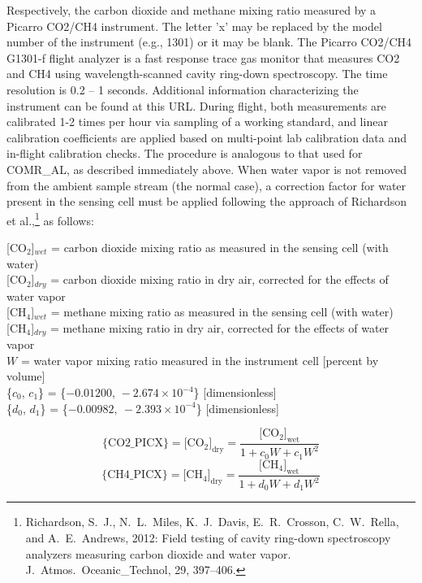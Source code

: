 \documentclass[
]{book}
\begin{document}
Respectively, the carbon dioxide and methane mixing ratio measured by a Picarro CO2/CH4 instrument. The letter 'x' may be replaced by the model number of the instrument (e.g., 1301) or it may be blank. The Picarro CO2/CH4 G1301-f flight analyzer is a fast response trace gas monitor that measures CO{2} and CH{4} using wavelength-scanned cavity ring-down spectroscopy. The time resolution is 0.2 -- 1 seconds. Additional information characterizing the instrument can be found at this URL. During flight, both measurements are calibrated 1-2 times per hour via sampling of a working standard, and linear calibration coefficients are applied based on multi-point lab calibration data and in-flight calibration checks. The procedure is analogous to that used for COMR\_AL, as described immediately above. When water vapor is not removed from the ambient sample stream (the normal case), a correction factor for water present in the sensing cell must be applied following the approach of Richardson et al.,\footnote{Richardson, S.~J., N.~L.~Miles, K.~J.~Davis, E.~R.~Crosson, C.~W.~Rella, and A.~E.~Andrews, 2012: Field testing of cavity ring-down spectroscopy analyzers measuring carbon dioxide and water vapor. J.~Atmos.~Oceanic\_Technol, 29, 397--406.}
as follows:

{[}CO\(_{2}\){]}\(_{wet}\) = carbon dioxide mixing ratio as measured
in the sensing cell (with water)\\
{[}CO\(_{2}\){]}\(_{dry}\) = carbon dioxide mixing ratio in dry air,
corrected for the effects of water vapor\\
{[}CH\(_{4}\){]}\(_{wet}\) = methane mixing ratio as measured in the
sensing cell (with water)\\
{[}CH\(_{4}\){]}\(_{dry}\) = methane mixing ratio in dry air, corrected
for the effects of water vapor\\
\(W\) = water vapor mixing ratio measured in the instrument cell {[}percent
by volume{]}\\
\{\(c_{0}\), \(c_{1}\)\} = \{\(-0.01200,\,-2.674\times10^{-4}\)\} {[}dimensionless{]}\\
\{\(d_{0}\), \(d_{1}\)\} = \{\(-0.00982,\ -2.393\times10^{-4}\)\} {[}dimensionless{]}

\begin{equation}
\{\mathrm{CO2\_PICX\}}=[\mathrm{CO_{2}]_{dry}=}\frac{[\mathrm{CO_{2}]_{wet}}}{1+c_{0}W+c_{1}W^{2}}
\label{eq:CO2PICbox1}
\end{equation}
\begin{equation}
\{\mathrm{CH4\_PICX\}}=[\mathrm{CH_{4}]_{dry}=}\frac{[\mathrm{CH_{4}]_{wet}}}{1+d_{0}W+d_{1}W^{2}}
\label{eq:CO2PICbox2}
\end{equation}
\end{document}
